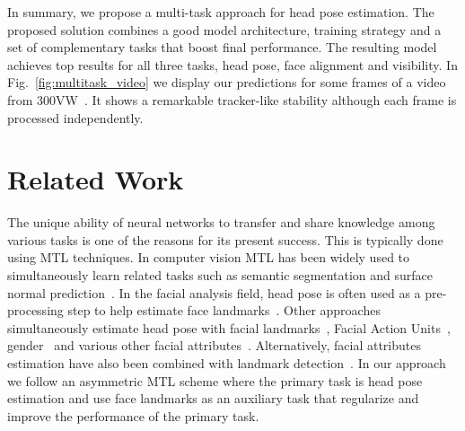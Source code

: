 \documentclass[9pt,technote,compsoc]{IEEEtran}
\begin{document}
In summary, we propose a multi-task approach for head pose estimation. The proposed solution combines a good model architecture, training strategy and a set of complementary tasks that boost final performance. The resulting model achieves top results for all three tasks, head pose, face alignment and visibility.
In Fig.~\ref{fig:multitask_video} we display our predictions for some frames of a video from 300VW~\cite{Shen15}. It shows a remarkable tracker-like stability although each frame is processed independently.





\section{Related Work}
\label{sec:related_work}

The unique ability of neural networks to transfer and share knowledge among various tasks is one of the reasons for its present success. This is typically done using MTL techniques.
In computer vision MTL has been widely used to simultaneously learn related tasks such as semantic segmentation and surface normal prediction~\cite{Kokkinos17}.
In the facial analysis field, head pose is often used as a pre-processing step to help estimate 
face landmarks~\cite{Dantone12,Yang15,Kumar18a}.
Other approaches simultaneously estimate head pose with facial landmarks~\cite{Kumar18b,Ranjan19}, Facial Action Units~\cite{Zhou17}, gender~\cite{Ranjan19} and various other facial attributes~\cite{Ranjan17}.
Alternatively, facial attributes estimation have also been combined with landmark detection~\cite{Zhang16,Ranjan17,Han18}.
In our approach we follow an asymmetric MTL scheme where the primary task is head pose estimation and use face landmarks as an auxiliary task that regularize and improve the performance of the primary task. 
\end{document}
